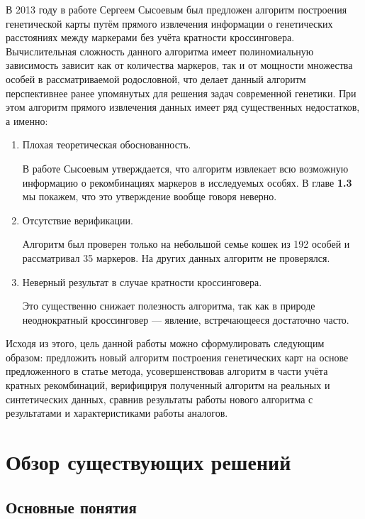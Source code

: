 \documentclass{matmex-diploma-custom}
\begin{document}
В 2013 году в работе \cite{sysoev} Сергеем Сысоевым был предложен
алгоритм построения генетической карты путём прямого извлечения
информации о генетических расстояниях между маркерами без учёта
кратности кроссинговера. Вычислительная сложность данного алгоритма
имеет полиномиальную зависимость зависит как от количества маркеров,
так и от мощности множества особей в рассматриваемой родословной, что
делает данный алгоритм перспективнее ранее упомянутых для решения
задач современной генетики. При этом алгоритм прямого извлечения
данных имеет ряд существенных недостатков, а именно:
\begin{enumerate}
\item Плохая теоретическая обоснованность.

  В работе \cite{sysoev} Сысоевым утверждается, что алгоритм извлекает
  всю возможную информацию о рекомбинациях маркеров в исследуемых
  особях. В главе \textbf{1.3} мы покажем, что это утверждение вообще
  говоря неверно.

\item Отсутствие верификации.

  Алгоритм был проверен только на небольшой семье кошек из 192 особей
  и рассматривал 35 маркеров. На других данных алгоритм не проверялся.

\item Неверный результат в случае кратности кроссинговера.

  Это существенно снижает полезность алгоритма, так как в природе
  неоднократный кроссинговер --- явление, встречающееся достаточно
  часто.

\end{enumerate}

Исходя из этого, цель данной работы можно сформулировать следующим
образом: предложить новый алгоритм построения генетических карт на
основе предложенного в статье \cite{sysoev} метода, усовершенствовав
алгоритм в части учёта кратных рекомбинаций, верифицируя полученный
алгоритм на реальных и синтетических данных, сравнив результаты работы
нового алгоритма с результатами и характеристиками работы аналогов.

\section{Обзор существующих решений}

\subsection*{Основные понятия}
\end{document}
